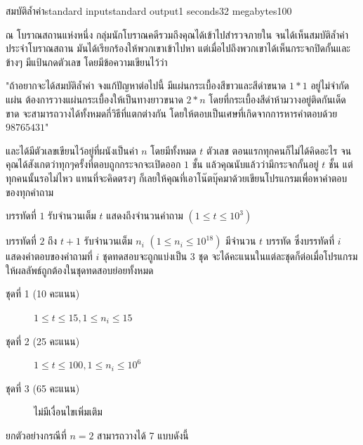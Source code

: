 \documentclass[11pt,a4paper]{article}
\begin{document}
\begin{problem}{สมบัติล้ำค่า}{standard input}{standard output}{1 seconds}{32 megabytes}{100}

ณ โบราณสถานแห่งหนึ่ง กลุ่มนักโบราณคดีรวมถึงคุณได้เข้าไปสำรวจภายใน จนได้เห็นสมบัติล้ำค่าประจำโบราณสถาน มันได้เรียกร้องให้พวกเขาเข้าไปหา แต่เมื่อไปถึงพวกเขาได้เห็นกระจกปิดกั้นและข้างๆ มีแป้นกดตัวเลข โดยมีข้อความเขียนไว้ว่า

\begin{center}
"ถ้าอยากจะได้สมบัติล้ำค่า จงแก้ปัญหาต่อไปนี้ มีแผ่นกระเบื้องสีขาวและสีดำขนาด $1*1$ อยู่ไม่จำกัดแผ่น ต้องการวางแผ่นกระเบื้องให้เป็นทางยาวขนาด $2*n$ โดยที่กระเบื้องสีดำห้ามวางอยู่ติดกันเด็ดขาด จะสามารถวางได้ทั้งหมดกี่วิธีที่แตกต่างกัน โดยให้ตอบเป็นเศษที่เกิดจากการหารคำตอบด้วย $98765431$"
\end{center}

และได้มีตัวเลขเขียนไว้อยู่ที่ผนังเป็นค่า $n$ โดยมีทั้งหมด $t$ ตัวเลข ตอนแรกทุกคนก็ไม่ได้คิดอะไร จนคุณได้สังเกตว่าทุกๆครั้งที่ตอบถูกกระจกจะเปิดออก $1$ ชั้น แล้วคุณนับแล้วว่ามีกระจกกั้นอยู่ $t$ ชั้น แต่ทุกคนนั้นรอไม่ไหว แทนที่จะคิดตรงๆ ก็เลยให้คุณที่เอาโน๊ตบุ๊คมาด้วยเขียนโปรแกรมเพื่อหาคำตอบของทุกคำถาม 

\InputFile
บรรทัดที่ $1$ รับจำนวนเต็ม $t$ แสดงถึงจำนวนคำถาม $(1 \leq t \leq 10^3)$

บรรทัดที่ $2$ ถึง $t + 1$ รับจำนวนเต็ม $n_i$ $(1 \leq n_i \leq10^{18})$
\OutputFile
มีจำนวน $t$ บรรทัด ซึ่งบรรทัดที่ $i$ แสดงคำตอบของคำถามที่ $i$ 
\Scoring
ชุดทดสอบจะถูกแบ่งเป็น $3$ ชุด จะได้คะแนนในแต่ละชุดก็ต่อเมื่อโปรแกรมให้ผลลัพธ์ถูกต้องในชุดทดสอบย่อยทั้งหมด

\begin{description}

\item[ชุดที่ 1 (10 คะแนน)]  $1 \leq t \leq 15 , 1 \leq n_i \leq 15$ 

\item[ชุดที่ 2 (25 คะแนน)] $1 \leq t \leq 100 , 1 \leq n_i \leq 10^{6}$

\item[ชุดที่ 3 (65 คะแนน)] ไม่มีเงื่อนไขเพิ่มเติม

\end{description}

\Examples

\begin{example}
%
%
\end{example}

\Note
\begin{note}
ยกตัวอย่างกรณีที่ $n = 2$ สามารถวางได้ 7 แบบดังนี้


\end{note}
\end{problem}
\end{document}
